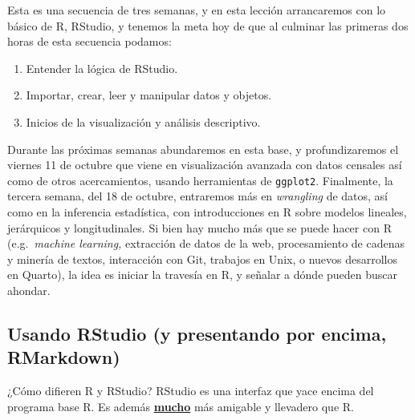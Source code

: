 \documentclass[
]{article}
\begin{document}
Esta es una secuencia de tres semanas, y en esta lección arrancaremos
con lo básico de R, RStudio, y tenemos la meta hoy de que al culminar
las primeras dos horas de esta secuencia podamos:

\begin{enumerate}
\def\labelenumi{\arabic{enumi}.}
\item
  Entender la lógica de RStudio.
\item
  Importar, crear, leer y manipular datos y objetos.
\item
  Inicios de la visualización y análisis descriptivo.
\end{enumerate}

Durante las próximas semanas abundaremos en esta base, y profundizaremos
el viernes 11 de octubre que viene en visualización avanzada con datos
censales así como de otros acercamientos, usando herramientas de
\texttt{ggplot2}. Finalmente, la tercera semana, del 18 de octubre,
entraremos más en \emph{wrangling} de datos, así como en la inferencia
estadística, con introducciones en R sobre modelos lineales, jerárquicos
y longitudinales. Si bien hay mucho más que se puede hacer con R
(e.g.~\emph{machine learning,} extracción de datos de la web,
procesamiento de cadenas y minería de textos, interacción con Git,
trabajos en Unix, o nuevos desarrollos en Quarto), la idea es iniciar la
travesía en R, y señalar a dónde pueden buscar ahondar.

\subsection{Usando RStudio (y presentando por encima,
RMarkdown)}\label{usando-rstudio-y-presentando-por-encima-rmarkdown}

¿Cómo difieren R y RStudio? RStudio es una interfaz que yace encima del
programa base R. Es además \ul{\textbf{mucho}} más amigable y llevadero
que R.
\end{document}
